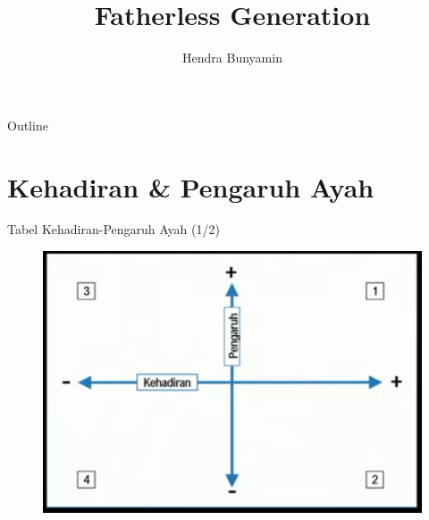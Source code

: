 \documentclass{beamer}
\title[Fatherless Generasi] %
{\textbf{Fatherless Generation}}
\author[Hendra Bunyamin] %
{Hendra Bunyamin}
\institute[ ] %
{
  \hfill \break
  \hfill \break 
  \hfill \break
  \hfill \break
  \large
  Renungan KOMIT Pria\\
  GKI Anugerah
}
\theoremstyle{mystyle}
\begin{document}
\begin{frame}
  \titlepage
\end{frame}

\begin{frame}{Outline}
  \tableofcontents
\end{frame}







\section{Kehadiran \& Pengaruh Ayah}
\begin{frame}{Tabel Kehadiran-Pengaruh Ayah (1/2)}
	\begin{figure}[!ht]
		\centering
		\includegraphics[scale=.3]{images/diagram-fatherless}
	\end{figure}
\end{frame}
\end{document}
